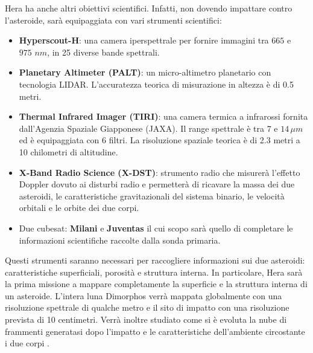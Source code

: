 Hera ha anche altri obiettivi scientifici. Infatti, non dovendo impattare contro l'asteroide, sarà equipaggiata con vari strumenti scientifici:
\begin{itemize}
    \item \textbf{Hyperscout-H}: una camera iperspettrale per fornire immagini tra $665$ e $975\,\, nm$, in 25 diverse bande spettrali.
    \item \textbf{Planetary Altimeter (PALT)}: un micro-altimetro planetario con tecnologia LIDAR. L'accuratezza teorica di misurazione in altezza è di 0.5 metri.
    \item \textbf{Thermal Infrared Imager (TIRI)}: una camera termica a infrarossi fornita dall'Agenzia Spaziale Giapponese (JAXA). Il range spettrale è tra $7$ e $14\,\mu m$ ed è equipaggiata con 6 filtri. La risoluzione spaziale teorica è di 2.3 metri a 10 chilometri di altitudine.
    \item \textbf{X-Band Radio Science (X-DST)}: strumento radio che misurerà l'effetto Doppler dovuto ai disturbi radio e permetterà di ricavare la massa dei due asteroidi, le caratteristiche gravitazionali del sistema binario, le velocità orbitali e le orbite dei due corpi.
    \item Due cubesat: \textbf{Milani} e \textbf{Juventas} il cui scopo sarà quello di completare le informazioni scientifiche raccolte dalla sonda primaria.
\end{itemize}
Questi strumenti saranno necessari per raccogliere informazioni sui due asteroidi: caratteristiche superficiali, porosità e struttura interna. In particolare, Hera sarà la prima missione a mappare completamente la superficie e la struttura interna di un asteroide. L'intera luna Dimorphos verrà mappata globalmente con una risoluzione spettrale di qualche metro e il sito di impatto con una risoluzione prevista di 10 centimetri. Verrà inoltre studiato come si è evoluta la nube di frammenti generatasi dopo l'impatto e le caratteristiche dell'ambiente circostante i due corpi \citep{michel_esa_2022}.


